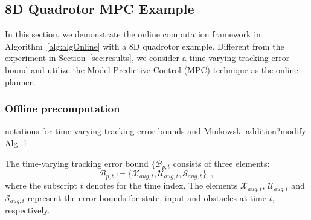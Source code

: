 \subsection{8D Quadrotor MPC Example \label{sec:resultsMPC}}
%
In this section, we demonstrate the online computation framework in Algorithm~\ref{alg:algOnline} with a 8D quadrotor example. Different from the experiment in Section~\ref{sec:results}, we consider a time-varying tracking error bound and utilize the Model Predictive Control (MPC) technique as the online planner. 
%
\subsubsection{Offline precomputation}
\color{blue} notations for time-varying tracking error bounds and Minkowski addition?modify Alg. 1\color{black}

The time-varying tracking error bound $\{\mathcal{B}_{p,t}$ consists of three elements:
\begin{equation}
\mathcal{B}_{p,t} :=\{\mathcal{X}_{aug,t}, \mathcal{U}_{aug,t}, \mathcal{S}_{aug,t}\}\enspace ,
\end{equation}
where the subscript $t$ denotes for the time index. The elements $\mathcal{X}_{aug,t}$,  $\mathcal{U}_{aug,t}$ and  $\mathcal{S}_{aug,t}$ represent the error bounds for state, input and obstacles at time $t$, respectively.
%
